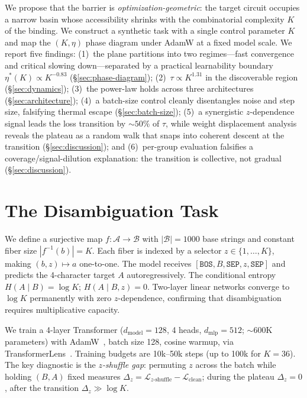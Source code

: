 \documentclass{article}
\begin{document}
We propose that the barrier is \emph{optimization-geometric}: the target circuit occupies a narrow basin whose accessibility shrinks with the combinatorial complexity $K$ of the binding.
We construct a synthetic task with a single control parameter $K$ and map the $(K, \eta)$ phase diagram under AdamW at a fixed model scale.
We report five findings: (1)~the plane partitions into two regimes---fast convergence and critical slowing down---separated by a practical learnability boundary $\eta^*(K) \propto K^{-0.83}$ (\S\ref{sec:phase-diagram}); (2)~$\tau \propto K^{1.31}$ in the discoverable region (\S\ref{sec:dynamics}); (3)~the power-law holds across three architectures (\S\ref{sec:architecture}); (4)~a batch-size control cleanly disentangles noise and step size, falsifying thermal escape (\S\ref{sec:batch-size}); (5)~a synergistic $z$-dependence signal leads the loss transition by ${\sim}50\%$ of $\tau$, while weight displacement analysis reveals the plateau as a random walk that snaps into coherent descent at the transition (\S\ref{sec:discussion}); and (6)~per-group evaluation falsifies a coverage/signal-dilution explanation: the transition is collective, not gradual (\S\ref{sec:discussion}).


\section{The Disambiguation Task}
\label{sec:task}

We define a surjective map $f: \mathcal{A} \to \mathcal{B}$ with $|\mathcal{B}| = 1000$ base strings and constant fiber size $|f^{-1}(b)| = K$.
Each fiber is indexed by a selector $z \in \{1, \ldots, K\}$, making $(b, z) \mapsto a$ one-to-one.
The model receives $[\texttt{BOS}, B, \texttt{SEP}, z, \texttt{SEP}]$ and predicts the 4-character target $A$ autoregressively.
The conditional entropy $H(A \mid B) = \log K$; $H(A \mid B, z) = 0$.
Two-layer linear networks converge to $\log K$ permanently with zero $z$-dependence, confirming that disambiguation requires multiplicative capacity.

We train a 4-layer Transformer ($d_\text{model} = 128$, 4 heads, $d_\text{mlp} = 512$; ${\sim}600$K parameters) with AdamW~\citep{loshchilov2019adamw}, batch size 128, cosine warmup, via TransformerLens~\citep{nanda2022transformerlens}.
Training budgets are 10k--50k steps (up to 100k for $K{=}36$).
The key diagnostic is the \emph{$z$-shuffle gap}: permuting $z$ across the batch while holding $(B, A)$ fixed measures $\Delta_z = \mathcal{L}_{z\text{-shuffle}} - \mathcal{L}_\text{clean}$; during the plateau $\Delta_z = 0$, after the transition $\Delta_z \gg \log K$.
\end{document}

